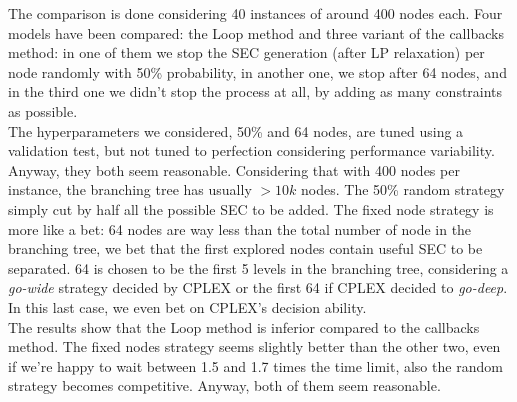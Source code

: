 The comparison is done considering 40 instances of around 400 nodes each. Four
models have been compared: the Loop method and three variant of the callbacks
method: in one of them we stop the SEC generation (after LP relaxation) per node
randomly with 50\% probability, in another one, we stop after 64 nodes, and in
the third one we didn't stop the process at all, by adding as many constraints
as possible.\\
The hyperparameters we considered, 50\% and 64 nodes, are tuned using a
validation test, but not tuned to perfection considering performance
variability. Anyway, they both seem reasonable. Considering that with 400 nodes
per instance, the branching tree has usually $>10k$ nodes. The 50\% random
strategy simply cut by half all the possible SEC to be added. The fixed node
strategy is more like a bet: 64 nodes are way less than the total number of node
in the branching tree, we bet that the first explored nodes contain useful SEC to
be separated. 64 is chosen to be the first 5 levels in the branching tree,
considering a \emph{go-wide} strategy decided by CPLEX or the first 64 if CPLEX
decided to \emph{go-deep}. In this last case, we even bet on CPLEX's decision
ability.\\

The results show that the Loop method is inferior compared to the callbacks
method. The fixed nodes strategy seems slightly better than the other two, even
if we're happy to wait between 1.5 and 1.7 times the time limit, also the random
strategy becomes competitive. Anyway, both of them seem reasonable.
